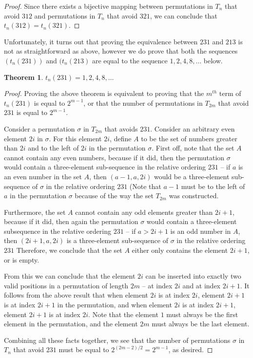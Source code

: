 \documentclass[11pt,letterpaper,twoside,english]{article}
\theoremstyle{theorem}
\newtheorem{theorem}{Theorem}
\theoremstyle{remark}
\begin{document}
\begin{proof}
Since there exists a bijective mapping between permutations in $T_n$ that avoid $312$ and permutations in $T_n$ that avoid $321$, we can conclude that $t_n(312) = t_n(321)$.

\end{proof}

Unfortunately, it turns out that proving the equivalence between $231$ and $213$ is not as straightforward as above, however we do prove that both the sequences $(t_n(231))$ and $(t_n(213)$ are equal to the sequence $1, 2, 4, 8, \ldots$ below.

\begin{theorem}
$t_n(231) = 1, 2, 4, 8, \ldots$
\end{theorem}

\begin{proof}
Proving the above theorem is equivalent to proving that the $m^{th}$ term of $t_n(231)$ is equal to $2^{m-1}$, or that the number of permutations in $T_{2m}$ that avoid $231$ is equal to $2^{m-1}$.

Consider a permutation $\sigma$ in $T_{2m}$ that avoids $231$. Consider an arbitrary even element $2i$ in $\sigma$. For this element $2i$, define $A$ to be the set of numbers greater than $2i$ and to the left of $2i$ in the permutation $\sigma$. First off, note that the set $A$ cannot contain any even numbers, because if it did, then the permutation $\sigma$ would contain a three-element sub-sequence in the relative ordering $231$ -- if $a$ is an even number in the set $A$, then $(a-1, a, 2i)$ would be a three-element sub-sequence of $\sigma$ in the relative ordering $231$ (Note that $a-1$ must be to the left of $a$ in the permutation $\sigma$ because of the way the set $T_{2m}$ was constructed.

Furthermore, the set $A$ cannot contain any odd elements greater than $2i+1$, because if it did, then again the permutation $\sigma$ would contain a three-element subsequence in the relative ordering $231$ -- if $a > 2i+1$ is an odd number in $A$, then $(2i+1, a, 2i)$ is a three-element sub-sequence of $\sigma$ in the relative ordering $231$ Therefore, we conclude that the set $A$ either only contains the element $2i+1$, or is empty.

From this we can conclude that the element $2i$ can be inserted into exactly two valid positions in a permutation of length $2m$ -- at index $2i$ and at index $2i+1$. It follows from the above result that when element $2i$ is at index $2i$, element $2i+1$ is at index $2i+1$ in the permutation, and when element $2i$ is at index $2i+1$, element $2i+1$ is at index $2i$. Note that the element $1$ must always be the first element in the permutation, and the element $2m$ must always be the last element.

Combining all these facts together, we see that the number of permutations $\sigma$ in $T_n$ that avoid $231$ must be equal to $2^{(2m-2)/2} = 2^{m-1}$, as desired.

\end{proof}
\end{document}
